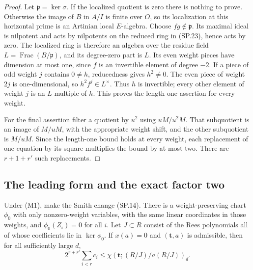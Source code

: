 \begin{proof}
Let $\mathfrak p=\ker\sigma$.  If the localized quotient is zero
there is nothing to prove.  Otherwise the image of $B$ in $A/I$ is
finite over $O$, so its localization at this horizontal prime is an
Artinian local $E$-algebra.  Choose $fg\notin\mathfrak p$.
Its maximal ideal is nilpotent and acts by nilpotents on the reduced
ring in (SP.23), hence acts by zero.  The localized ring is therefore
an algebra over the residue field $L=\operatorname{Frac}(B/\mathfrak p)$,
and its degree-zero part is $L$.  Its even weight pieces have
dimension at most one, since $f$ is an invertible element of degree
$-2$.  If a piece of odd weight $j$ contains $0\ne h$, reducedness
gives $h^2\ne0$.  The even piece of weight $2j$ is one-dimensional,
so $h^2f^j\in L^\times$.  Thus $h$ is invertible; every other
element of weight $j$ is an $L$-multiple of $h$.  This proves the
length-one assertion for every weight.

For the final assertion filter a quotient by $u^2$ using
$uM/u^2M$.  That subquotient is an image of $M/uM$, with the
appropriate weight shift, and the other subquotient is $M/uM$.
Since the length-one bound holds at every weight, each replacement
of one equation by its square multiplies the bound by at most two.
There are $r+1+r'$ such replacements.
\end{proof}

\subsection{The leading form and the exact factor two}

\begin{lemma}
\label{claim:SP5}
Under (M1), make the Smith change (SP.14).  There is a
weight-preserving chart $\phi_0$ with only nonzero-weight variables,
with the same linear coordinates in those weights, and
$\phi_0(Z_i)=0$ for all $i$.  Let $J\subset R$ consist of the Rees
polynomials all of whose coefficients lie in $\ker\phi_0$.
If $x(a)=0$ and $(\mathbf t,a)$ is admissible, then for all
sufficiently large $d$,
\[
 2^{r+r'}\sum_{i<r}c_i
              \le\chi(\mathbf t;(R/J)/a(R/J))_d.
 \tag{SP.24}
\]
\end{lemma}

